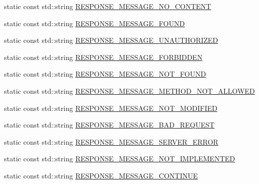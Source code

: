 \begin{DoxyCompactItemize}
static const std\-::string \hyperlink{structpion_1_1http_1_1types_aa883de68ebea3c99a630f506acbc15ad}{R\-E\-S\-P\-O\-N\-S\-E\-\_\-\-M\-E\-S\-S\-A\-G\-E\-\_\-\-N\-O\-\_\-\-C\-O\-N\-T\-E\-N\-T}
\item 
static const std\-::string \hyperlink{structpion_1_1http_1_1types_a3c4967430712b0756c053c3cdd7a8494}{R\-E\-S\-P\-O\-N\-S\-E\-\_\-\-M\-E\-S\-S\-A\-G\-E\-\_\-\-F\-O\-U\-N\-D}
\item 
static const std\-::string \hyperlink{structpion_1_1http_1_1types_a587d94bed01177054387f448b7c5287c}{R\-E\-S\-P\-O\-N\-S\-E\-\_\-\-M\-E\-S\-S\-A\-G\-E\-\_\-\-U\-N\-A\-U\-T\-H\-O\-R\-I\-Z\-E\-D}
\item 
static const std\-::string \hyperlink{structpion_1_1http_1_1types_ab08701ef8170cbb0514f813f3846dd7d}{R\-E\-S\-P\-O\-N\-S\-E\-\_\-\-M\-E\-S\-S\-A\-G\-E\-\_\-\-F\-O\-R\-B\-I\-D\-D\-E\-N}
\item 
static const std\-::string \hyperlink{structpion_1_1http_1_1types_a2a3504c60731df6c0aa6f77b4aeb0b23}{R\-E\-S\-P\-O\-N\-S\-E\-\_\-\-M\-E\-S\-S\-A\-G\-E\-\_\-\-N\-O\-T\-\_\-\-F\-O\-U\-N\-D}
\item 
static const std\-::string \hyperlink{structpion_1_1http_1_1types_ae21baafd36761b8bb82a2c06c5565cf1}{R\-E\-S\-P\-O\-N\-S\-E\-\_\-\-M\-E\-S\-S\-A\-G\-E\-\_\-\-M\-E\-T\-H\-O\-D\-\_\-\-N\-O\-T\-\_\-\-A\-L\-L\-O\-W\-E\-D}
\item 
static const std\-::string \hyperlink{structpion_1_1http_1_1types_ade4b1c7fb04dbf6b323a21f7d1959330}{R\-E\-S\-P\-O\-N\-S\-E\-\_\-\-M\-E\-S\-S\-A\-G\-E\-\_\-\-N\-O\-T\-\_\-\-M\-O\-D\-I\-F\-I\-E\-D}
\item 
static const std\-::string \hyperlink{structpion_1_1http_1_1types_a8b1ca932d6f4b9061bef4e7cc3fca724}{R\-E\-S\-P\-O\-N\-S\-E\-\_\-\-M\-E\-S\-S\-A\-G\-E\-\_\-\-B\-A\-D\-\_\-\-R\-E\-Q\-U\-E\-S\-T}
\item 
static const std\-::string \hyperlink{structpion_1_1http_1_1types_a27379812e3cfc86bf6ef43e873b25231}{R\-E\-S\-P\-O\-N\-S\-E\-\_\-\-M\-E\-S\-S\-A\-G\-E\-\_\-\-S\-E\-R\-V\-E\-R\-\_\-\-E\-R\-R\-O\-R}
\item 
static const std\-::string \hyperlink{structpion_1_1http_1_1types_ad65de0d9732bfdb57998871b071c4aba}{R\-E\-S\-P\-O\-N\-S\-E\-\_\-\-M\-E\-S\-S\-A\-G\-E\-\_\-\-N\-O\-T\-\_\-\-I\-M\-P\-L\-E\-M\-E\-N\-T\-E\-D}
\item 
static const std\-::string \hyperlink{structpion_1_1http_1_1types_acb63fcfb74186e6fed84492d02735417}{R\-E\-S\-P\-O\-N\-S\-E\-\_\-\-M\-E\-S\-S\-A\-G\-E\-\_\-\-C\-O\-N\-T\-I\-N\-U\-E}
\item 

\end{DoxyCompactItemize}
